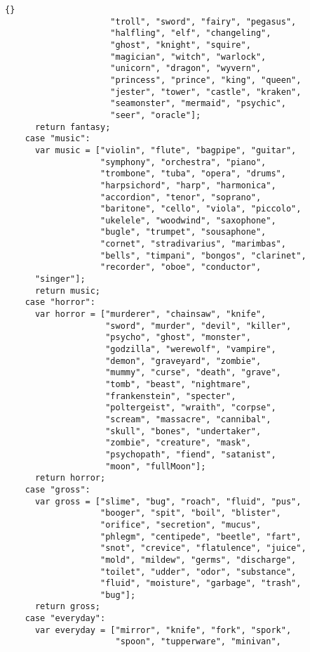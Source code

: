 \documentclass[twoside]{article}
\begin{document}
\begin{lstlisting}{}
                     "troll", "sword", "fairy", "pegasus",
                     "halfling", "elf", "changeling",
                     "ghost", "knight", "squire",
                     "magician", "witch", "warlock",
                     "unicorn", "dragon", "wyvern",
                     "princess", "prince", "king", "queen",
                     "jester", "tower", "castle", "kraken",
                     "seamonster", "mermaid", "psychic",
                     "seer", "oracle"];
      return fantasy;
    case "music":
      var music = ["violin", "flute", "bagpipe", "guitar",
                   "symphony", "orchestra", "piano",
                   "trombone", "tuba", "opera", "drums", 
                   "harpsichord", "harp", "harmonica",
                   "accordion", "tenor", "soprano",
                   "baritone", "cello", "viola", "piccolo",
                   "ukelele", "woodwind", "saxophone",
                   "bugle", "trumpet", "sousaphone",
                   "cornet", "stradivarius", "marimbas",
                   "bells", "timpani", "bongos", "clarinet",
                   "recorder", "oboe", "conductor",
      "singer"];
      return music;
    case "horror":
      var horror = ["murderer", "chainsaw", "knife", 
                    "sword", "murder", "devil", "killer",
                    "psycho", "ghost", "monster",
                    "godzilla", "werewolf", "vampire",
                    "demon", "graveyard", "zombie",
                    "mummy", "curse", "death", "grave",
                    "tomb", "beast", "nightmare",
                    "frankenstein", "specter",
                    "poltergeist", "wraith", "corpse",
                    "scream", "massacre", "cannibal",
                    "skull", "bones", "undertaker",
                    "zombie", "creature", "mask",
                    "psychopath", "fiend", "satanist",
                    "moon", "fullMoon"];
      return horror;
    case "gross":
      var gross = ["slime", "bug", "roach", "fluid", "pus",
                   "booger", "spit", "boil", "blister",
                   "orifice", "secretion", "mucus",
                   "phlegm", "centipede", "beetle", "fart",
                   "snot", "crevice", "flatulence", "juice",
                   "mold", "mildew", "germs", "discharge",
                   "toilet", "udder", "odor", "substance", 
                   "fluid", "moisture", "garbage", "trash",
                   "bug"];
      return gross;
    case "everyday":
      var everyday = ["mirror", "knife", "fork", "spork",
                      "spoon", "tupperware", "minivan",

\end{lstlisting}
\end{document}
